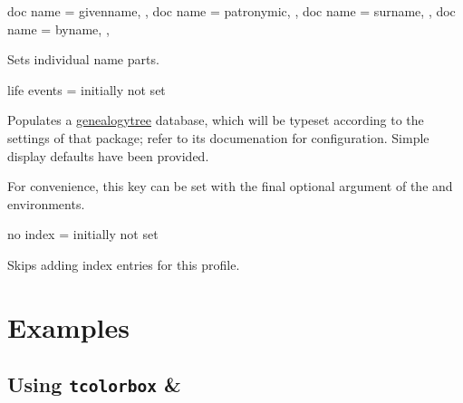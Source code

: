 \documentclass[
	a4paper,
]{article}
\begin{document}
\begin{docKeys}
	[
		doc parameter = {=\meta{...}},
		doc description = {initially not set},
	]
	{
		{
			doc name = givenname,
		},
		{
			doc name = patronymic,
		},
		{
			doc name = surname,
		},
		{
			doc name = byname,
		},
	}

	Sets individual name parts.

\end{docKeys}

\begin{docKey}
	{life events}
	{=}
	{initially not set}

	Populates a \href{https://ctan.org/pkg/genealogytree}{genealogytree} database, which will be typeset according to the settings of that package; refer to its documenation for configuration. Simple display defaults have been provided.

	For convenience, this key can be set with the final optional argument of the  and  environments.
\end{docKey}

\begin{docKey}
	{no index}
	{=}
	{initially not set}

	Skips adding index entries for this profile.
\end{docKey}

\clearpage
\section{Examples} %

\label{sec:examples}

\subsection{Using \texttt{tcolorbox} \& }
\end{document}

